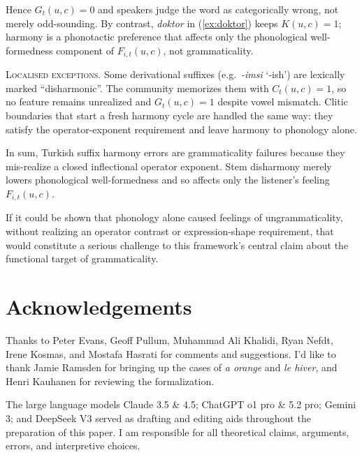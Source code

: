 \documentclass[12pt,letterpaper]{article}
\newcommand{\mention}[1]{\textit{#1}}
\newcommand{\olang}[1]{\textit{#1}}
\begin{document}
Hence $G_t(u,c)=0$ and speakers judge the word as categorically wrong, not merely
odd-sounding. By contrast, \mention{doktor} in (\ref{ex:doktor}) keeps $K(u,c)=1$;
harmony is a phonotactic preference that affects only the phonological
well-formedness component of $F_{i,t}(u,c)$, not grammaticality.

\textsc{Localised exceptions.}
Some derivational suffixes (e.g.~\mention{-imsi} `-ish') are lexically
marked \enquote{disharmonic}. The community memorizes them with $C_t(u,c)=1$, so no
feature remains unrealized and $G_t(u,c)=1$ despite vowel mismatch. Clitic
boundaries that start a fresh harmony cycle \autocite{KabakVogel2001} are
handled the same way: they satisfy the operator-exponent requirement and leave
harmony to phonology alone.

In sum, Turkish suffix harmony errors are grammaticality failures because they
mis-realize a closed inflectional operator exponent. Stem disharmony merely lowers phonological well-formedness and so affects only
the listener's feeling $F_{i,t}(u,c)$.



If it could be shown that phonology alone caused feelings of ungrammaticality, without realizing an operator contrast or expression-shape requirement, that would constitute a serious challenge to this framework's central claim about the functional target of grammaticality.


\newpage
\section*{Acknowledgements}
Thanks to Peter Evans, Geoff Pullum, Muhammad Ali Khalidi, Ryan Nefdt, Irene Kosmas, and Mostafa Hasrati for comments and suggestions. I'd like to thank Jamie Ramsden for bringing up the cases of \mention{a orange} and \olang{le hiver}, and Henri Kauhanen for reviewing the formalization.

The large language models Claude 3.5 \& 4.5; ChatGPT o1 pro \& 5.2 pro; Gemini 3; and DeepSeek V3 served as drafting and editing aids throughout the preparation of this paper. I am responsible for all theoretical claims, arguments, errors, and interpretive choices.

\newpage
\begin{sloppypar}
\printbibliography[title=References]
\end{sloppypar}
\end{document}
